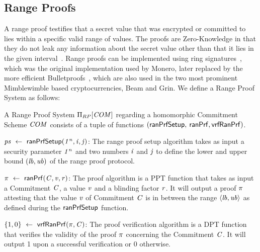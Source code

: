 
\subsection{Range Proofs} \label{sec:pre:rangeproof}

A range proof testifies that a secret value that was encrypted or committed to lies within a specific valid range of values.
The proofs are Zero-Knowledge in that they do not leak any information about the secret value other than that it lies in the given interval~\cite{bunz2018bulletproofs}.
Range proofs can be implemented using ring signatures~\cite{noether2016ring}, which was the original implementation used by Monero, later replaced by the more efficient Bulletproofs~\cite{bunz2018bulletproofs}, which are also used in the two most prominent Mimblewimble based cryptocurrencies, Beam and Grin.
We define a Range Proof System as follows:

\begin{definition}\label{def:pre:rangeproof}
    A Range Proof System $\Pi_{RP}[\mathit{COM}]$ regarding a homomorphic Commitment Scheme $\mathit{COM}$ consists of a tuple of functions $(\mathsf{ranPrfSetup},$ $\mathsf{ranPrf}, \mathsf{vrfRanPrf})$.
    \begin{asparaitem}
        \item $\mathit{ps} ~\leftarrow~ \mathsf{ranPrfSetup}(\mathit{1^n},\mathit{i},\mathit{j})$: The range proof setup algorithm takes as input a security parameter $\mathit{1^n}$ and two numbers $\mathit{i}$ and $\mathit{j}$ to define the lower and upper bound $(\mathit{lb}, \mathit{ub})$ of the range proof protocol.
        \item $\pi ~\leftarrow~ \mathsf{ranPrf}(\mathit{C},\mathit{v},\mathit{r})$: The proof algorithm is a PPT function that takes as input a Commitment $\mathit{C}$, a value $\mathit{v}$ and a blinding factor $\mathit{r}$.
        It will output a proof $\pi$ attesting that the value $\mathit{v}$ of Commitment $\mathit{C}$ is in between the range $\langle \mathit{lb}, \mathit{ub} \rangle$ as defined during the $\mathsf{ranPrfSetup}$ function.
        \item $\{1,0\} ~\leftarrow~ \mathsf{vrfRanPrf}(\pi,\mathit{C})$: The proof verification algorithm is a DPT function that verifies the validity of the proof $\pi$ concerning the Commitment $\mathit{C}$.
        It will output 1 upon a successful verification or 0 otherwise.
    \end{asparaitem}
\end{definition}

